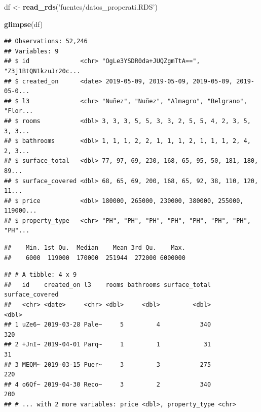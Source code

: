 \documentclass[]{book}
\newenvironment{Shaded}{\begin{snugshade}}{\end{snugshade}}
\newcommand{\DecValTok}[1]{\textcolor[rgb]{0.00,0.00,0.81}{#1}}
\newcommand{\KeywordTok}[1]{\textcolor[rgb]{0.13,0.29,0.53}{\textbf{#1}}}
\newcommand{\NormalTok}[1]{#1}
\newcommand{\OperatorTok}[1]{\textcolor[rgb]{0.81,0.36,0.00}{\textbf{#1}}}
\newcommand{\StringTok}[1]{\textcolor[rgb]{0.31,0.60,0.02}{#1}}
\begin{document}
\begin{Shaded}
\begin{Highlighting}[]
\NormalTok{df <-}\StringTok{ }\KeywordTok{read_rds}\NormalTok{(}\StringTok{'fuentes/datos_properati.RDS'}\NormalTok{)}

\KeywordTok{glimpse}\NormalTok{(df)}
\end{Highlighting}
\end{Shaded}

\begin{verbatim}
## Observations: 52,246
## Variables: 9
## $ id              <chr> "OgLe3YSDR0da+JUQZgmTtA==", "Z3j1BtQN1kzuJr20c...
## $ created_on      <date> 2019-05-09, 2019-05-09, 2019-05-09, 2019-05-0...
## $ l3              <chr> "Nuñez", "Nuñez", "Almagro", "Belgrano", "Flor...
## $ rooms           <dbl> 3, 3, 3, 5, 5, 3, 3, 2, 5, 5, 4, 2, 3, 5, 3, 3...
## $ bathrooms       <dbl> 1, 1, 1, 2, 2, 1, 1, 1, 2, 1, 1, 1, 2, 4, 2, 3...
## $ surface_total   <dbl> 77, 97, 69, 230, 168, 65, 95, 50, 181, 180, 89...
## $ surface_covered <dbl> 68, 65, 69, 200, 168, 65, 92, 38, 110, 120, 11...
## $ price           <dbl> 180000, 265000, 230000, 380000, 255000, 119000...
## $ property_type   <chr> "PH", "PH", "PH", "PH", "PH", "PH", "PH", "PH"...
\end{verbatim}

\begin{Shaded}
\end{Shaded}

\begin{verbatim}
##    Min. 1st Qu.  Median    Mean 3rd Qu.    Max. 
##    6000  119000  170000  251944  272000 6000000
\end{verbatim}

\begin{Shaded}
\end{Shaded}

\begin{verbatim}
## # A tibble: 4 x 9
##   id    created_on l3    rooms bathrooms surface_total surface_covered
##   <chr> <date>     <chr> <dbl>     <dbl>         <dbl>           <dbl>
## 1 uZe6~ 2019-03-28 Pale~     5         4           340             320
## 2 +JnI~ 2019-04-01 Parq~     1         1            31              31
## 3 MEQM~ 2019-03-15 Puer~     3         3           275             220
## 4 o6Qf~ 2019-04-30 Reco~     3         2           340             200
## # ... with 2 more variables: price <dbl>, property_type <chr>
\end{verbatim}
\end{document}
